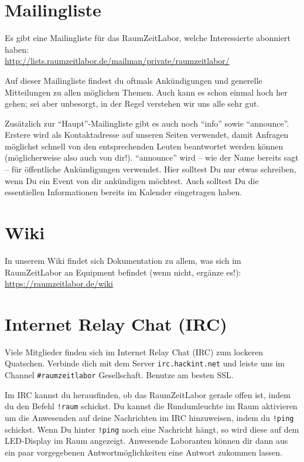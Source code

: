 \documentclass[12pt, DIV16, a4paper]{scrartcl}
\begin{document}
\section*{Mailingliste}

Es gibt eine Mailingliste für das RaumZeitLabor, welche Interessierte abonniert
haben:\\
\url{http://lists.raumzeitlabor.de/mailman/private/raumzeitlabor/}
\np

Auf dieser Mailingliste findest du oftmals Ankündigungen und generelle
Mitteilungen zu allen möglichen Themen. Auch kann es schon einmal hoch her
gehen; sei aber unbesorgt, in der Regel verstehen wir uns alle sehr gut.
\np

Zusätzlich zur ``Haupt''-Mailingliste gibt es auch noch ``info'' sowie
``announce''. Erstere wird als Kontaktadresse auf unseren Seiten verwendet,
damit Anfragen möglichst schnell von den entsprechenden Leuten beantwortet
werden können (möglicherweise also auch von dir!). ``announce'' wird -- wie der
Name bereits sagt -- für öffentliche Ankündigungen verwendet. Hier solltest Du
nur etwas schreiben, wenn Du ein Event von dir ankündigen möchtest. Auch
solltest Du die essentiellen Informationen bereits im Kalender eingetragen
haben.

\section*{Wiki}

In unserem Wiki findet sich Dokumentation zu allem, was sich im RaumZeitLabor
an Equipment befindet (wenn nicht, ergänze es!):
\url{https://raumzeitlabor.de/wiki}

\section*{Internet Relay Chat (IRC)}

Viele Mitglieder finden sich im Internet Relay Chat (IRC) zum lockeren
Quatschen. Verbinde dich mit dem Server \texttt{irc.hackint.net} und leiste uns
im Channel \texttt{\#raumzeitlabor} Gesellschaft. Benutze am besten SSL.
\np

Im IRC kannst du herausfinden, ob das RaumZeitLabor gerade offen ist, indem du
den Befehl \texttt{!raum} schickst. Du kannst die Rundumleuchte im Raum
aktivieren um die Anwesenden auf deine Nachrichten im IRC hinzuweisen, indem du
\texttt{!ping} schickst. Wenn Du hinter \texttt{!ping} noch eine Nachricht
hängt, so wird diese auf dem LED-Display im Raum angezeigt. Anwesende
Laboranten können dir dann aus ein paar vorgegebenen Antwortmöglichkeiten eine
Antwort zukommen lassen.
\np
\end{document}
